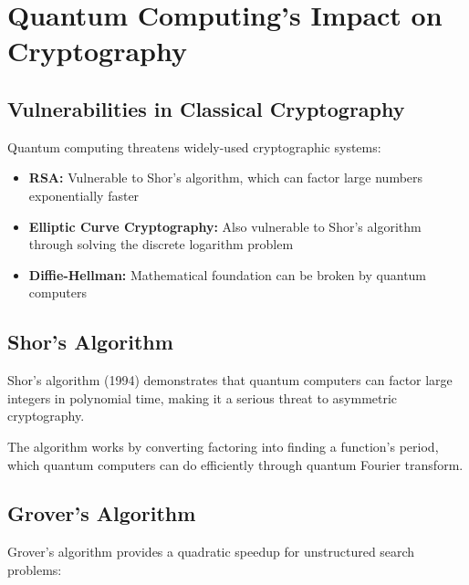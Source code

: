 \chapter{Quantum Computing's Impact on Cryptography}

\section{Vulnerabilities in Classical Cryptography}

Quantum computing threatens widely-used cryptographic systems:

\begin{itemize}
    \item \textbf{RSA:} Vulnerable to Shor's algorithm, which can factor large numbers exponentially faster
    \item \textbf{Elliptic Curve Cryptography:} Also vulnerable to Shor's algorithm through solving the discrete logarithm problem
    \item \textbf{Diffie-Hellman:} Mathematical foundation can be broken by quantum computers
\end{itemize}


\section{Shor's Algorithm}

Shor's algorithm (1994) demonstrates that quantum computers can factor large integers in polynomial time, making it a serious threat to asymmetric cryptography.

The algorithm works by converting factoring into finding a function's period, which quantum computers can do efficiently through quantum Fourier transform.

\section{Grover's Algorithm}

Grover's algorithm provides a quadratic speedup for unstructured search problems:


